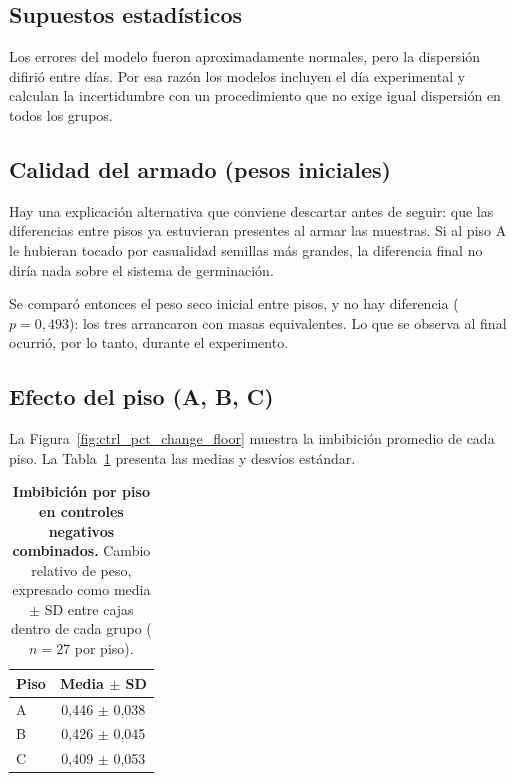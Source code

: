 \subsection{Supuestos estadísticos}

Los errores del modelo fueron aproximadamente normales, pero la dispersión difirió entre días. Por esa razón los modelos incluyen el día experimental y calculan la incertidumbre con un procedimiento que no exige igual dispersión en todos los grupos.

\subsection{Calidad del armado (pesos iniciales)}

Hay una explicación alternativa que conviene descartar antes de seguir: que las diferencias entre pisos ya estuvieran presentes al armar las muestras. Si al piso A le hubieran tocado por casualidad semillas más grandes, la diferencia final no diría nada sobre el sistema de germinación.

Se comparó entonces el peso seco inicial entre pisos, y no hay diferencia (\(p = 0{,}493\)): los tres arrancaron con masas equivalentes. Lo que se observa al final ocurrió, por lo tanto, durante el experimento.

\subsection{Efecto del piso (A, B, C)}

La Figura~\ref{fig:ctrl_pct_change_floor} muestra la imbibición promedio de cada piso. La Tabla~\ref{tab:ctrl_floor} presenta las medias y desvíos estándar.

\begin{table}[tbp]
\small
\setlength{\tabcolsep}{3pt}
\centering
\caption[Imbibición por piso en controles negativos]{\textbf{Imbibición por piso en controles negativos combinados.} Cambio relativo de peso, expresado como media \(\pm\) SD entre cajas dentro de cada grupo (\(n = 27\) por piso).}
\label{tab:ctrl_floor}
\begin{tabular}{lc}
\toprule
Piso & Media \(\pm\) SD \\
\midrule
A & 0,446 \(\pm\) 0,038 \\
B & 0,426 \(\pm\) 0,045 \\
C & 0,409 \(\pm\) 0,053 \\
\bottomrule
\end{tabular}
\end{table}


